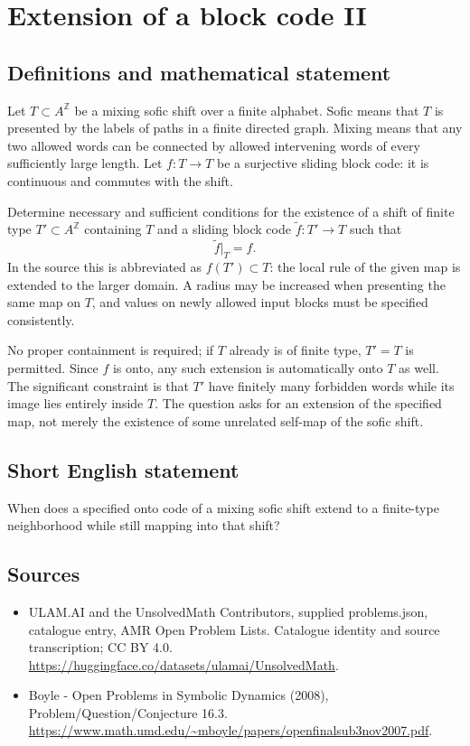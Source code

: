 \documentclass[11pt,a4paper]{article}
\begin{document}
\section*{Extension of a block code II}\label{statement}

\subsection{Definitions and mathematical statement}
Let $T\subset A^{\mathbb Z}$ be a mixing sofic shift over a finite
alphabet. Sofic means that $T$ is presented by the labels of paths in
a finite directed graph. Mixing means that any two allowed words can
be connected by allowed intervening words of every sufficiently large
length. Let $f:T\to T$ be a surjective sliding block code: it is
continuous and commutes with the shift.

Determine necessary and sufficient conditions for the existence of a
shift of finite type $T'\subset A^{\mathbb Z}$ containing $T$ and a
sliding block code $\widetilde f:T'\to T$ such that
\[
                    \widetilde f|_T=f.
\]
In the source this is abbreviated as $f(T')\subset T$: the local rule
of the given map is extended to the larger domain. A radius may be
increased when presenting the same map on $T$, and values on newly
allowed input blocks must be specified consistently.

No proper containment is required; if $T$ already is of finite type,
$T'=T$ is permitted. Since $f$ is onto, any such extension is
automatically onto $T$ as well. The significant constraint is that
$T'$ have finitely many forbidden words while its image lies entirely
inside $T$. The question asks for an extension of the specified map,
not merely the existence of some unrelated self-map of the sofic shift.
\subsection{Short English statement}
When does a specified onto code of a mixing sofic shift extend to a finite-type neighborhood while still mapping into that shift?
\subsection{Sources}
\begin{itemize}
\item[S1] ULAM.AI and the UnsolvedMath Contributors, supplied problems.json, catalogue entry, AMR Open Problem Lists. Catalogue identity and source transcription; CC BY 4.0.
\url{https://huggingface.co/datasets/ulamai/UnsolvedMath}.
\item[S2] Boyle - Open Problems in Symbolic Dynamics (2008), Problem/Question/Conjecture 16.3. 
\url{https://www.math.umd.edu/~mboyle/papers/openfinalsub3nov2007.pdf}.
\end{itemize}
\end{document}
